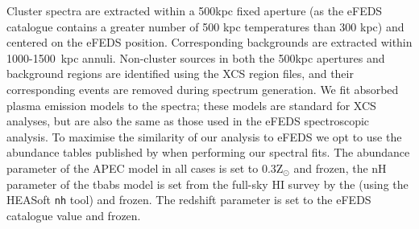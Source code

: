 \documentclass[fleqn,usenatbib]{mnras}
\begin{document}
Cluster spectra are extracted within a 500kpc fixed aperture (as the eFEDS catalogue contains a greater number of 500 kpc temperatures than 300 kpc) and centered on the eFEDS position.  Corresponding backgrounds are extracted within 1000-1500~kpc annuli. Non-cluster sources in both the 500kpc apertures and background regions are identified using the XCS region files, and their corresponding events are removed during spectrum generation.  We fit absorbed \cite[with tbabs, ][]{tbabs} plasma emission models \citep[APEC, ][]{apec} to the spectra; these models are standard for XCS analyses, but are also the same as those used in the eFEDS spectroscopic analysis. To maximise the similarity of our analysis to eFEDS we opt to use the abundance tables published by \cite{aspl} when performing our spectral fits. The abundance parameter of the APEC model in all cases is set to 0.3Z$_{\odot}$ and frozen, the nH parameter of the tbabs model is set from the full-sky HI survey by the \cite{nh} (using the HEASoft \texttt{nh} tool) and frozen. The redshift parameter is set to the eFEDS catalogue value and frozen.

\end{document}

